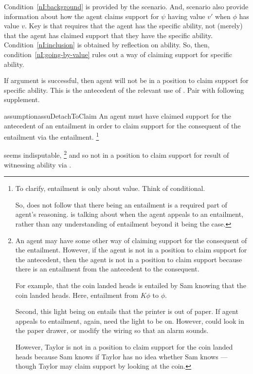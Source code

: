 \begin{note}
  Condition~\ref{nI:background} is provided by the scenario.
  And, scenario also provide information about how the agent claims support for \(\psi\) having value \(v'\) when \(\phi\) has value \(v\).
  Key is that  requires that the agent has the specific ability, not (merely) that the agent has claimed support that they have the specific ability.
  Condition~\ref{nI:inclusion} is obtained by reflection on ability.
  So, then, condition~\ref{nI:going-by-value} rules out a way of claiming support for specific ability.
\end{note}

\begin{note}
  If argument is successful, then agent will not be in a position to claim support for specific ability.
  This is the antecedent of the relevant use of .
  Pair \nI{} with following supplement.

  \begin{restatable}[]{assumption}{assuDetachToClaim}\label{assu:detach-to-claim}
    An agent must have claimed support for the antecedent of an entailment in order to claim support for the consequent of the entailment via the entailment.\nolinebreak
    \footnote{To clarify, entailment is only about value.
      Think of conditional.

      So, does not follow that there being an entailment is a required part of agent's reasoning.
      \nIm{} is talking about when the agent appeals to an entailment, rather than any understanding of entailment beyond it being the case.
    }
  \end{restatable}
  \nIm{} seems indisputable,\nolinebreak
  \footnote{
    An agent may have some other way of claiming support for the consequent of the entailment.
    However, if the agent is not in a position to claim support for the antecedent, then the agent is not in a position to claim support because there is an entailment from the antecedent to the consequent.\nolinebreak

    For example, that the coin landed heads is entailed by Sam knowing that the coin landed heads.
    Here, entailment from \(K\phi\) to \(\phi\).

    Second, this light being on entails that the printer is out of paper.
    If agent appeals to entailment, again, need the light to be on.
    However, could look in the paper drawer, or modify the wiring so that an alarm sounds.

    However, Taylor is not in a position to claim support for the coin landed heads because Sam knows if Taylor has no idea whether Sam knows --- though Taylor may claim support by looking at the coin.
  }
  and so not in a position to claim support for result of witnessing ability via \AR{}.
\end{note}


